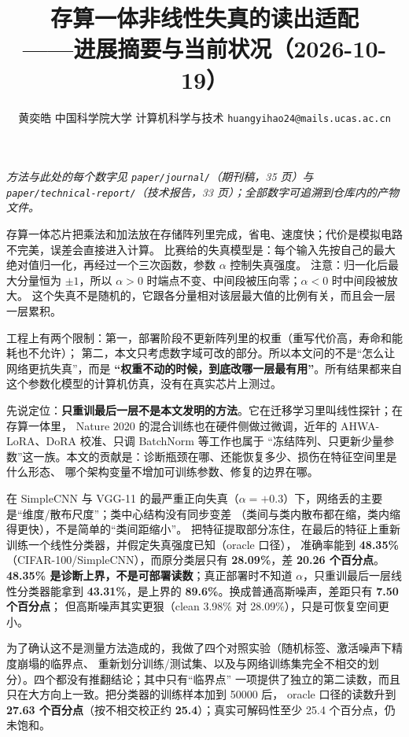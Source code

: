 \documentclass[10pt,a4paper]{ctexart}
\title{\vspace{-2.9em}\bfseries 存算一体非线性失真的读出适配\\[2pt]
       \large ——进展摘要与当前状况（2026-10-19）}
\author{\small 黄奕皓 \quad 中国科学院大学 计算机科学与技术 \quad \texttt{huangyihao24@mails.ucas.ac.cn}}
\date{}
\newcommand{\hl}[1]{\textbf{#1}}
\newcommand{\sect}[1]{\vspace{0.06em}\noindent{\normalsize\bfseries #1}\par\vspace{0.00em}}
\begin{document}
\maketitle
\vspace{-3.5em}
\small

\begin{center}
\small\itshape
方法与此处的每个数字见 \texttt{paper/journal/}（期刊稿，35 页）与
\texttt{paper/technical-report/}（技术报告，33 页）；全部数字可追溯到仓库内的产物文件。
\end{center}

\sect{一、这个工作在问什么}
存算一体芯片把乘法和加法放在存储阵列里完成，省电、速度快；代价是模拟电路不完美，误差会直接进入计算。
比赛给的失真模型是：每个输入先按自己的最大绝对值归一化，再经过一个三次函数，参数 $\alpha$ 控制失真强度。
注意：归一化后最大分量恒为 $\pm1$，所以 $\alpha>0$ 时端点不变、中间段被压向零；$\alpha<0$ 时中间段被放大。
这个失真不是随机的，它跟各分量相对该层最大值的比例有关，而且会一层一层累积。

工程上有两个限制：第一，部署阶段不更新阵列里的权重（重写代价高，寿命和能耗也不允许）；
第二，本文只考虑数字域可改的部分。所以本文问的不是“怎么让网络更抗失真”，而是
\hl{“权重不动的时候，到底改哪一层最有用”}。所有结果都来自这个参数化模型的计算机仿真，没有在真实芯片上测过。

\sect{二、主要结论}
先说定位：\hl{只重训最后一层不是本文发明的方法}。它在迁移学习里叫线性探针；在存算一体里，
Nature 2020 的混合训练也在硬件侧做过微调，近年的 AHWA-LoRA、DoRA 校准、只调 BatchNorm 等工作也属于
“冻结阵列、只更新少量参数”这一族。本文的贡献是：诊断瓶颈在哪、还能恢复多少、损伤在特征空间里是什么形态、
哪个架构变量不增加可训练参数、修复的边界在哪。

在 SimpleCNN 与 VGG-11 的最严重正向失真（$\alpha=+0.3$）下，网络丢的主要是“维度/散布尺度”；类中心结构没有同步变差
（类间与类内散布都在缩，类内缩得更快），不是简单的“类间距缩小”。
把特征提取部分冻住，在最后的特征上重新训练一个线性分类器，并假定失真强度已知（oracle 口径），
准确率能到 \hl{48.35\%}（CIFAR-100/SimpleCNN），而原分类层只有 \hl{28.09\%}，差 \hl{20.26 个百分点}。
\textbf{48.35\% 是诊断上界，不是可部署读数}；真正部署时不知道 $\alpha$，只重训最后一层线性分类器能拿到
\hl{43.31\%}，是上界的 \hl{89.6\%}。换成普通高斯噪声，差距只有 \hl{7.50 个百分点}；
但高斯噪声其实更狠（clean 3.98\% 对 28.09\%），只是可恢复空间更小。

为了确认这不是测量方法造成的，我做了四个对照实验（随机标签、激活噪声下精度崩塌的临界点、
重新划分训练/测试集、以及与网络训练集完全不相交的划分）。四个都没有推翻结论；其中只有“临界点”
一项提供了独立的第二读数，而且只在大方向上一致。把分类器的训练样本加到 50000 后，
oracle 口径的读数升到 \hl{27.63 个百分点}（按不相交校正约 \hl{25.4}）；真实可解码性至少 25.4 个百分点，仍未饱和。
\end{document}
